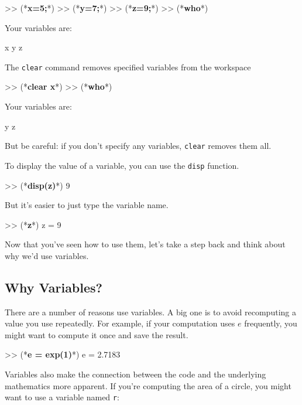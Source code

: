 
\begin{code}
>> (*\textbf{x=5;}*)
>> (*\textbf{y=7;}*)
>> (*\textbf{z=9;}*)
>> (*\textbf{who}*)

Your variables are:

x  y  z
\end{code}

The \lstinline{clear} command removes specified variables from the workspace

\begin{code}
>> (*\textbf{clear x}*)
>> (*\textbf{who}*)

Your variables are:

y z
\end{code}

But be careful: if you don't specify any variables, \lstinline{clear} removes them all.


To display the value of a variable, you can use the \lstinline{disp} function.

\begin{code}
>> (*\textbf{disp(z)}*)
     9
\end{code}

But it's easier to just type the variable name.

\begin{code}
>> (*\textbf{z}*)
z = 9
\end{code}

Now that you've seen how to use them, let's take a step back and think about why we'd use variables.

\subsection{Why Variables?}

There are a number of reasons use variables. 
A big one is to avoid recomputing a value you use repeatedly.  For
example, if your computation uses $e$ frequently, you might
want to compute it once and save the result.

\begin{code}
>> (*\textbf{e = exp(1)}*)
e = 2.7183
\end{code}

Variables also make the connection between the code and the underlying
mathematics more apparent.  If you're computing the area of a circle,
you might want to use a variable named \lstinline{r}:

